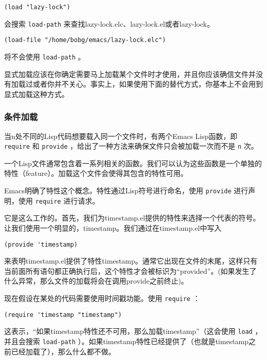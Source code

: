 \begin{verbatim}
(load "lazy-lock")
\end{verbatim}

会搜索 \texttt{load-path} 来查找lazy-lock.elc、lazy-lock.el或者lazy-lock。

\begin{verbatim}
(load-file "/home/bobg/emacs/lazy-lock.elc")
\end{verbatim}

将不会使用 \texttt{load-path} 。

显式加载应该在你确定需要马上加载某个文件时才使用，并且你应该确信文件并没有加载过或者你并不关心。事实上，如果使用下面的替代方式，你基本上不会用到显式加载这种方式。

\subsubsection{条件加载}
\label{section:05-Conditional-Loading}

当n处不同的Lisp代码想要载入同一个文件时，有两个Emacs Lisp函数，即 \texttt{require} 和 \texttt{provide} ，给出了一种方法来确保文件只会被加载一次而不是 \texttt{n} 次。

一个Lisp文件通常包含着一系列相关的函数。我们可以认为这些函数是一个单独的特性（feature）。加载这个文件会使得其包含的特性可用。

Emacs明确了特性这个概念。特性通过Lisp符号进行命名，使用 \texttt{provide} 进行声明，使用 \texttt{require} 进行请求。

它是这么工作的。首先，我们为timestamp.el提供的特性来选择一个代表的符号。让我们使用一个明显的，timestamp。我们通过在timestamp.el中写入

\begin{verbatim}
(provide 'timestamp)
\end{verbatim}

来表明timestamp.el提供了特性timestamp。通常它出现在文件的末尾，这样只有当前面所有语句都正确执行后，这个特性才会被标识为“provided”。(如果发生了什么异常，那么文件的加载将会在调用provide之前终止)。

现在假设在某处的代码需要使用时间戳功能。使用 \texttt{require} ：

\begin{verbatim}
(require 'timestamp "timestamp")
\end{verbatim}

这表示，“如果timestamp特性还不可用，那么加载timestamp”（这会使用 \texttt{load} ，并且会搜索 \texttt{load-path} ）。如果timestamp特性已经提供了（也就是timestamp之前已经加载了），那么什么都不做。


